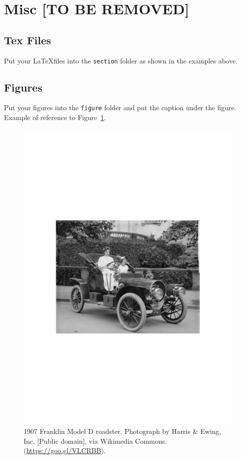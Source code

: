 \documentclass{ceurart}
\begin{document}










\iffalse
\section{Misc [TO BE REMOVED]}

\subsection{Tex Files}

Put your \LaTeX files into the \texttt{section} folder as shown in the examples above.

\subsection{Figures}

Put your figures into the \texttt{figure} folder and put the caption under the figure. Example of reference to Figure~\ref{fig:sample-figure}.

\begin{figure}
  \centering
  \includegraphics[width=0.8\linewidth]{figure/sample.pdf}
  \caption{1907 Franklin Model D roadster. Photograph by Harris \& Ewing, Inc. [Public domain], via Wikimedia Commons. (\url{https://goo.gl/VLCRBB}).}
  \label{fig:sample-figure}
\end{figure}
\end{document}
